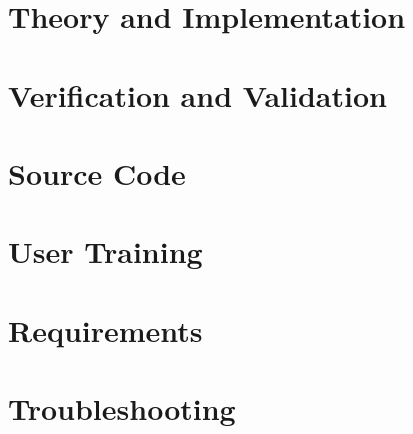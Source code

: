 \documentclass{simcenterdocumentation}
\begin{document}
\chapter{Theory and Implementation}
\label{chap:theory}


\chapter{Verification and Validation}
\label{chap:vnv}


\chapter{Source Code}
\label{chap:SourceCode}


\chapter{User Training}
\label{chap:training}


\chapter{Requirements}
\label{chap:requirements}




\chapter{Troubleshooting}
\label{chap:troubleshooting}


\nocite{*}


\pagestyle{plain}
{
  \renewcommand{\thispagestyle}[1]{}	
  \printbibliography           
}
\end{document}
